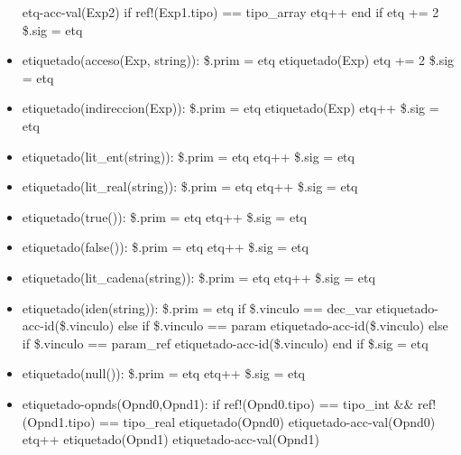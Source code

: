 \documentclass[11pt]{article}
\begin{document}
\begin{itemize}
            \subitem etq-acc-val(Exp2)
            \subitem if ref!(Exp1.tipo) == tipo\_array
                \subsubitem etq++
            \subitem end if
            \subitem etq += 2
            \subitem \$.sig = etq
        \item etiquetado(acceso(Exp, string)): 
            \subitem \$.prim = etq
            \subitem etiquetado(Exp)
            \subitem etq += 2
            \subitem \$.sig = etq
        \item etiquetado(indireccion(Exp)): 
            \subitem \$.prim = etq
            \subitem etiquetado(Exp)
            \subitem etq++
            \subitem \$.sig = etq
        \item etiquetado(lit\_ent(string)): 
            \subitem \$.prim = etq
            \subitem etq++
            \subitem \$.sig = etq
        \item etiquetado(lit\_real(string)): 
            \subitem \$.prim = etq
            \subitem etq++
            \subitem \$.sig = etq
        \item etiquetado(true()): 
            \subitem \$.prim = etq
            \subitem etq++
            \subitem \$.sig = etq
        \item etiquetado(false()): 
            \subitem \$.prim = etq
            \subitem etq++
            \subitem \$.sig = etq
        \item etiquetado(lit\_cadena(string)): 
            \subitem \$.prim = etq
            \subitem etq++
            \subitem \$.sig = etq
        \item etiquetado(iden(string)): 
            \subitem \$.prim = etq
            \subitem if \$.vinculo == dec\_var 
                \subsubitem etiquetado-acc-id(\$.vinculo)
            \subitem else if \$.vinculo == param 
                \subsubitem etiquetado-acc-id(\$.vinculo)
            \subitem else if \$.vinculo == param\_ref 
                \subsubitem etiquetado-acc-id(\$.vinculo)
            \subitem end if
            \subitem \$.sig = etq
        \item etiquetado(null()): 
            \subitem \$.prim = etq
            \subitem etq++
            \subitem \$.sig = etq
        \item etiquetado-opnds(Opnd0,Opnd1): 
            \subitem if ref!(Opnd0.tipo) == tipo\_int \&\& ref!(Opnd1.tipo) == tipo\_real
                \subsubitem etiquetado(Opnd0)
                \subsubitem etiquetado-acc-val(Opnd0)
                \subsubitem etq++
                \subsubitem etiquetado(Opnd1)
                \subsubitem etiquetado-acc-val(Opnd1)

\end{itemize}
\end{document}
